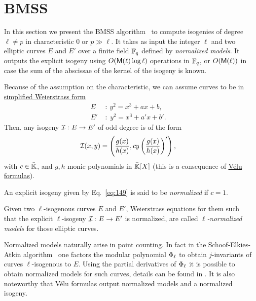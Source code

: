 \section{BMSS}
\label{sec:bmss}
In this section we present the BMSS
algorithm~\cite{bostan+morain+salvy+schost08} to compute isogenies of
degree $\ell\ne p$ in characteristic $0$ or $p\gg\ell$. It takes as
input the integer $\ell$ and two elliptic curves $E$ and $E'$ over a
finite field $\mathbb{F}_q$ defined by \emph{normalized models}. It outputs
the explicit isogeny using $O(\mathsf{M}(\ell)\log\ell)$ operations in
$\mathbb{F}_q$, or $O(\mathsf{M}(\ell))$ in case the sum of the abscissae of the
kernel of the isogeny is known.

Because of the assumption on the characteristic, we can assume curves
to be in \hyperref[th:simplified-weierstrass]{simplified Weierstrass
  form}
\begin{equation}
  \label{eq:140}
  \begin{aligned}
    E \;&:\: y^2 = x^3 + ax + b\text{,}\\
    E'\;&:\; y^2 = x^3 + a'x + b'\text{.}
  \end{aligned}
\end{equation}
Then, any isogeny $\mathcal{I}:E\rightarrow E'$ of odd degree is of the form
\begin{equation}
  \label{eq:149}
  \mathcal{I}(x,y) = \left(\frac{g(x)}{h(x)},cy\left(\frac{g(x)}{h(x)}\right)'\right)
  \text{,}
\end{equation}
with $c\in\bar{\mathbb{K}}$, and $g,h$ monic polynomials in $\bar{\mathbb{K}}[X]$
(this is a consequence of \hyperref[eq:159]{Vélu formulas}).

\begin{definition}
  \label{def:canon-isog}
  An explicit isogeny given by Eq.~\eqref{eq:149} is said to be
  \emph{normalized}
  if $c=1$. 

  Given two $\ell$-isogenous curves $E$ and $E'$, Weierstrass
  equations for them such that the explicit $\ell$-isogeny
  $\mathcal{I}:E\rightarrow E'$ is normalized, are called
  \emph{$\ell$-normalized models} for those
  elliptic curves.
\end{definition}

Normalized models naturally arise in point counting. In fact in the
Schoof-Elkies-Atkin
algorithm~\cite{atkin88,elkies92,elkies98,schoof95} one factors the
modular polynomial $\Phi_\ell$ to obtain $j$-invariants of curves
$\ell$-isogenous to $E$. Using the partial derivatives of
$\Phi_\ell$ it is possible to obtain normalized models for such
curves, details can be found in
\cite{schoof95,morain95,elkies98,lercier-algorithmique}. It is also
noteworthy that Vélu formulas output normalized models and a
normalized isogeny.


